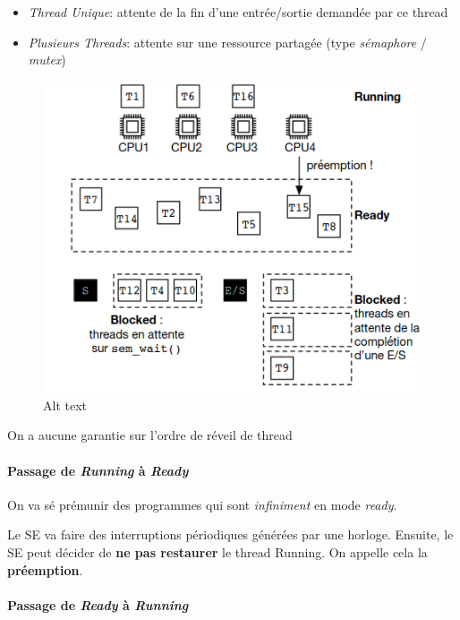 \begin{itemize}
\tightlist
\item
  \emph{Thread Unique}: attente de la fin d'une entrée/sortie demandée
  par ce thread
\item
  \emph{Plusieurs Threads}: attente sur une ressource partagée (type
  \emph{sémaphore} / \emph{mutex})
\end{itemize}

\begin{figure}
\centering
\includegraphics{image-30.png}
\caption{Alt text}
\end{figure}

On a aucune garantie sur l'ordre de réveil de thread

\paragraph{\texorpdfstring{Passage de \emph{Running} à
\emph{Ready}}{Passage de Running à Ready}}\label{passage-de-running-uxe0-ready}

On va sé prémunir des programmes qui sont \emph{infiniment} en mode
\emph{ready}.

Le SE va faire des interruptions périodiques générées par une horloge.
Ensuite, le SE peut décider de \textbf{ne pas restaurer} le thread
Running. On appelle cela la \textbf{préemption}.

\paragraph{\texorpdfstring{Passage de \emph{Ready} à
\emph{Running}}{Passage de Ready à Running}}\label{passage-de-ready-uxe0-running}


